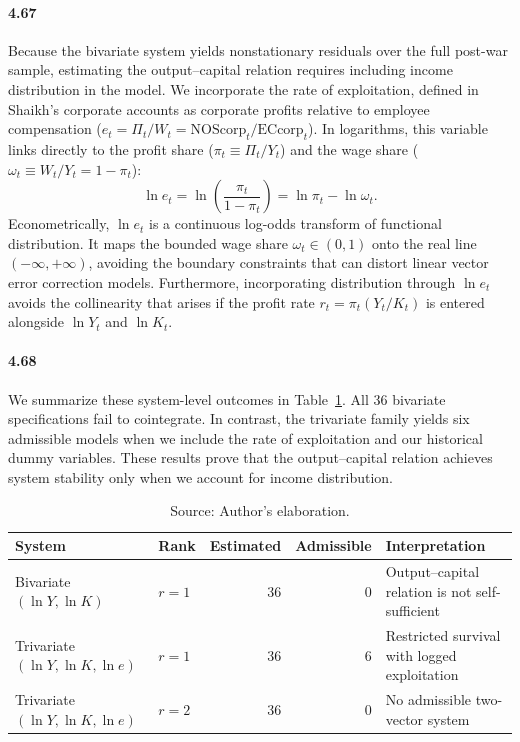 \paragraph{4.67}
Because the bivariate system yields nonstationary residuals over the full post-war sample, estimating the output--capital relation requires including income distribution in the model. We incorporate the rate of exploitation, defined in Shaikh's corporate accounts as corporate profits relative to employee compensation ($e_t = \Pi_t / W_t = \text{NOScorp}_t / \text{ECcorp}_t$). In logarithms, this variable links directly to the profit share ($\pi_t \equiv \Pi_t / Y_t$) and the wage share ($\omega_t \equiv W_t / Y_t = 1 - \pi_t$):
\begin{equation}
\label{eq:exploitation_log_odds}
\ln e_t = \ln \left( \frac{\pi_t}{1 - \pi_t} \right) = \ln \pi_t - \ln \omega_t.
\end{equation}
Econometrically, $\ln e_t$ is a continuous log-odds transform of functional distribution. It maps the bounded wage share $\omega_t \in (0, 1)$ onto the real line $(-\infty, +\infty)$, avoiding the boundary constraints that can distort linear vector error correction models. Furthermore, incorporating distribution through $\ln e_t$ avoids the collinearity that arises if the profit rate $r_t = \pi_t (Y_t / K_t)$ is entered alongside $\ln Y_t$ and $\ln K_t$.

\paragraph{4.68}
We summarize these system-level outcomes in Table~\ref{tab:s2_admissibility_outcomes}. All 36 bivariate specifications fail to cointegrate. In contrast, the trivariate family yields six admissible models when we include the rate of exploitation and our historical dummy variables. These results prove that the output--capital relation achieves system stability only when we account for income distribution.

\begin{table}[H]
\centering
\caption{S2 System Admissibility Outcomes}
\label{tab:s2_admissibility_outcomes}
\small
\begin{tabular}{llrrp{5.0cm}}
\toprule
System & Rank & Estimated & Admissible & Interpretation \\
\midrule
\midrule
Bivariate $(\ln Y,\ln K)$ & $r=1$ & 36 & 0 & Output--capital relation is not self-sufficient \\
Trivariate $(\ln Y,\ln K,\ln e)$ & $r=1$ & 36 & 6 & Restricted survival with logged exploitation \\
Trivariate $(\ln Y,\ln K,\ln e)$ & $r=2$ & 36 & 0 & No admissible two-vector system \\
\bottomrule
\end{tabular}
\caption*{\footnotesize Source: Author's elaboration.}
\end{table}

